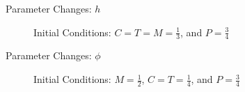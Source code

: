 \documentclass{beamer}
\begin{document}
\begin{frame}{Parameter Changes: $h$}
    \begin{figure}
        \centering
        \caption{Initial Conditions: $C = T = M = \frac{1}{3}$, and $P = \frac{3}{4}$}
        \label{fig:h_animation}
    \end{figure}
\end{frame}


\begin{frame}{Parameter Changes: $\phi$}
    \begin{figure}
        \centering
        \caption{Initial Conditions: $M = \frac{1}{2}$, $C = T = \frac{1}{4}$, and $P = \frac{3}{4}$}
        \label{fig:phi_animation}
    \end{figure}
\end{frame}


\end{document}
